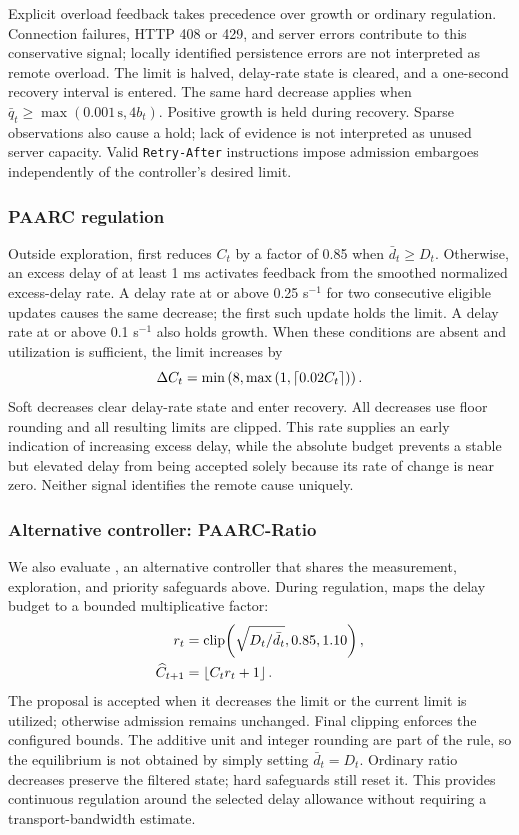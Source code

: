 Explicit overload feedback takes precedence over growth or ordinary regulation. Connection failures, HTTP 408 or 429, and server errors contribute to this conservative signal; locally identified persistence errors are not interpreted as remote overload. The limit is halved, delay-rate state is cleared, and a one-second recovery interval is entered. The same hard decrease applies when $\bar q_t\geq\max(0.001\,\mathrm{s},4b_t)$. Positive growth is held during recovery. Sparse observations also cause a hold; lack of evidence is not interpreted as unused server capacity. Valid \texttt{Retry-After} instructions impose admission embargoes independently of the controller's desired limit.

\subsubsection{PAARC regulation}
Outside exploration, \paarc{} first reduces $C_t$ by a factor of 0.85 when $\bar d_t\geq D_t$. Otherwise, an excess delay of at least 1 ms activates feedback from the smoothed normalized excess-delay rate. A delay rate at or above 0.25 s$^{-1}$ for two consecutive eligible updates causes the same decrease; the first such update holds the limit. A delay rate at or above 0.1 s$^{-1}$ also holds growth. When these conditions are absent and utilization is sufficient, the limit increases by
\begin{equation}
\Delta C_t=\min\left(8,\max\left(1,\left\lceil 0.02C_t\right\rceil\right)\right).
\label{eq:paarc-growth}
\end{equation}
Soft decreases clear delay-rate state and enter recovery. All decreases use floor rounding and all resulting limits are clipped. This rate supplies an early indication of increasing excess delay, while the absolute budget prevents a stable but elevated delay from being accepted solely because its rate of change is near zero. Neither signal identifies the remote cause uniquely.

\subsubsection{Alternative controller: PAARC-Ratio}
We also evaluate \ratio{}, an alternative controller that shares the measurement, exploration, and priority safeguards above. During regulation, \ratio{} maps the delay budget to a bounded multiplicative factor:
\begin{align}
r_t&=\operatorname{clip}\!\left(\sqrt{D_t/\bar d_t},0.85,1.10\right),\\
\widehat C_{t+1}&=\left\lfloor C_t r_t+1\right\rfloor.
\label{eq:ratio}
\end{align}
The proposal is accepted when it decreases the limit or the current limit is utilized; otherwise admission remains unchanged. Final clipping enforces the configured bounds. The additive unit and integer rounding are part of the rule, so the equilibrium is not obtained by simply setting $\bar d_t=D_t$. Ordinary ratio decreases preserve the filtered state; hard safeguards still reset it. This provides continuous regulation around the selected delay allowance without requiring a transport-bandwidth estimate.

